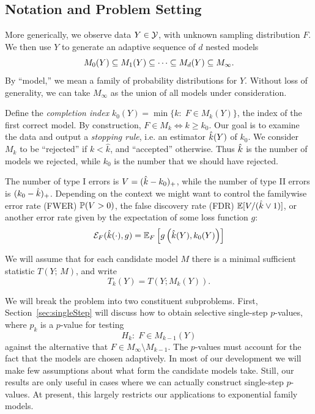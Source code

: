 \documentclass{article}
\begin{document}
\subsection{Notation and Problem Setting}\label{sec:genericSetting}

More generically, we observe data $Y \in \cY$, with unknown sampling distribution $F$. We then use $Y$ to generate an adaptive sequence of $d$ nested models
\[
M_0(Y) \sub M_1(Y) \sub \cdots \sub M_d(Y) \sub M_\infty.
\]
By ``model,'' we mean a family of probability distributions for $Y$. Without loss of generality, we can take $M_\infty$ as the union of all models under consideration. 

Define the {\em completion index} $k_0(Y) = \min\{k:\; F \in M_k(Y)\}$, the index of the first correct model. By construction, $F\in M_k \iff k \geq k_0$. Our goal is to examine the data and output a {\em stopping rule}, i.e. an estimator $\hk(Y)$ of $k_0$. We consider $M_k$ to be ``rejected'' if $k < \hat k$, and ``accepted'' otherwise. Thus $\hk$ is the number of models we rejected, while $k_0$ is the number that we should have rejected. 

The number of type I errors is $V=(\hk-k_0)_+$, while the number of type II errors is $(k_0-\hk)_+$. Depending on the context we might want to control the familywise error rate (FWER) $\P(V>0)$, the false discovery rate (FDR) $\E[V/(\hk \vee 1)]$, or another error rate given by the expectation of some loss function $g$:
\begin{equation}\label{eq:errRate}
\Err_F(\hk(\cdot), g) = \E_F\left[ g\left(\hk(Y), k_0(Y)\right)\right]
\end{equation}

We will assume that for each candidate model $M$ there is a minimal sufficient statistic $T(Y; \,M)$, and write
\[
T_k(Y) = T(Y; M_k(Y)).
\]

We will break the problem into two constituent subproblems. First, Section~\ref{sec:singleStep} will discuss how to obtain selective single-step $p$-values, where $p_k$ is a $p$-value for testing
\[
H_{k}:\; F\in M_{k-1}(Y)
\]
against the alternative that $F\in M_\infty\setminus M_{k-1}$. The $p$-values must account for the fact that the models are chosen adaptively. In most of our development we will make few assumptions about what form the candidate models take. Still, our results are only useful in cases where we can actually construct single-step $p$-values. At present, this largely restricts our applications to exponential family models.
\end{document}
